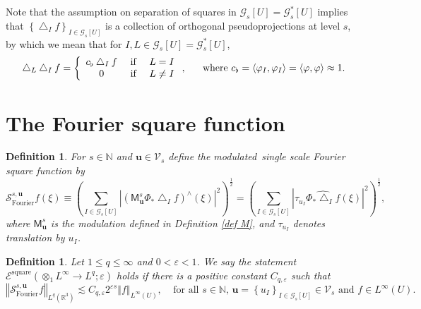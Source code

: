 \documentclass{amsart}%
\theoremstyle{plain}
\newtheorem{definition}[theorem]{Definition}
\numberwithin{equation}{section}
\begin{document}
Note that the assumption on separation of squares in $\mathcal{G}_{s}\left[
U\right]  =\mathcal{G}_{s}^{\ast}\left[  U\right]  $ implies that $\left\{
\bigtriangleup_{I}f\right\}  _{I\in\mathcal{G}_{s}\left[  U\right]  }$ is a
collection of orthogonal pseudoprojections at level $s$, by which we mean that
for $I,L\in\mathcal{G}_{s}\left[  U\right]  =\mathcal{G}_{s}^{\ast}\left[
U\right]  $,%
\begin{equation}
\bigtriangleup_{L}\bigtriangleup_{I}f=\left\{
\begin{array}
[c]{ccc}%
c_{\flat}\bigtriangleup_{I}f & \text{ if } & L=I\\
0 & \text{ if } & L\not =I
\end{array}
\right.  ,\ \ \ \ \ \text{where }c_{\flat}=\left\langle \varphi_{I}%
,\varphi_{I}\right\rangle =\left\langle \varphi,\varphi\right\rangle \approx1.
\label{pseudo}%
\end{equation}


\section{The Fourier square function}

\begin{definition}
For $s\in\mathbb{N}$ and $\mathbf{u}\in\mathcal{V}_{s}$ define the
\emph{modulated\ single scale }Fourier square function by
\begin{equation}
\mathcal{S}_{\operatorname*{Fourier}}^{s,\mathbf{u}}f\left(  \xi\right)
\equiv\left(  \sum_{I\in\mathcal{G}_{s}\left[  U\right]  }\left\vert \left(
\mathsf{M}_{\mathbf{u}}^{s}\Phi_{\ast}\bigtriangleup_{I}f\right)  ^{\wedge
}\left(  \xi\right)  \right\vert ^{2}\right)  ^{\frac{1}{2}}=\left(
\sum_{I\in\mathcal{G}_{s}\left[  U\right]  }\left\vert \tau_{u_{I}}%
\widehat{\Phi_{\ast}\bigtriangleup_{I}f}\left(  \xi\right)  \right\vert
^{2}\right)  ^{\frac{1}{2}}, \label{def Four square}%
\end{equation}
where $\mathsf{M}_{\mathbf{u}}^{s}$ is the modulation defined in Definition
\ref{def M}, and $\tau_{u_{I}}$ denotes translation by $u_{I}$.
\end{definition}

\begin{definition}
Let $1\leq q\leq\infty$ and $0<\varepsilon<1$. We say the statement
$\mathcal{E}^{\operatorname*{square}}\left(  \otimes_{1}L^{\infty}\rightarrow
L^{q};\varepsilon\right)  $ holds if there is a positive constant
$C_{q,\varepsilon}$ such that%
\begin{equation}
\left\Vert \mathcal{S}_{\operatorname*{Fourier}}^{s,\mathbf{u}}f\right\Vert
_{L^{q}\left(  \mathbb{R}^{3}\right)  }\lesssim C_{q,\varepsilon
}2^{\varepsilon s}\left\Vert f\right\Vert _{L^{\infty}\left(  U\right)
},\ \ \ \ \ \text{for all }s\in\mathbb{N}\text{, }\mathbf{u}=\left\{
u_{I}\right\}  _{I\in\mathcal{G}_{s}\left[  U\right]  }\in\mathcal{V}%
_{s}\text{ and }f\in L^{\infty}\left(  U\right)  . \label{FECUS}%
\end{equation}

\end{definition}
\end{document}

